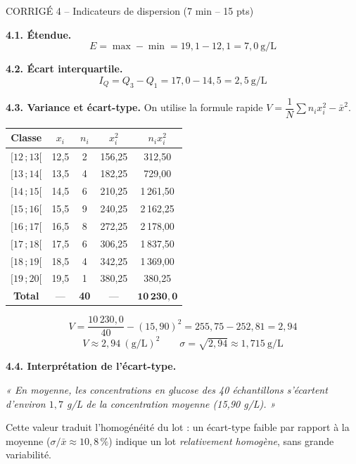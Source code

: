 \documentclass[11pt,a4paper]{article}
\begin{document}
\begin{epreuve}{CORRIGÉ 4 -- Indicateurs de dispersion \hfill \small (7 min -- 15 pts)}

\vspace{0.2cm}
\textbf{4.1. Étendue.}
$$\boxed{E = \max - \min = 19{,}1 - 12{,}1 = 7{,}0\ \text{g/L}}$$

\vspace{0.3cm}
\textbf{4.2. Écart interquartile.}
$$\boxed{I_Q = Q_3 - Q_1 = 17{,}0 - 14{,}5 = 2{,}5\ \text{g/L}}$$

\vspace{0.3cm}
\textbf{4.3. Variance et écart-type.} On utilise la formule rapide $V = \dfrac{1}{N}\sum n_i x_i^2 - \bar{x}^2$.

\begin{center}
\small
\renewcommand{\arraystretch}{1.35}
\begin{tabular}{|c|c|c|c|c|}
\hline
\rowcolor{corrige!15}
\textbf{Classe} & $x_i$ & $n_i$ & $x_i^2$ & $n_i x_i^2$ \\
\hline
$[12\,;13[$ & 12{,}5 & 2 & 156{,}25 & 312{,}50 \\
\hline
$[13\,;14[$ & 13{,}5 & 4 & 182{,}25 & 729{,}00 \\
\hline
$[14\,;15[$ & 14{,}5 & 6 & 210{,}25 & 1\,261{,}50 \\
\hline
$[15\,;16[$ & 15{,}5 & 9 & 240{,}25 & 2\,162{,}25 \\
\hline
$[16\,;17[$ & 16{,}5 & 8 & 272{,}25 & 2\,178{,}00 \\
\hline
$[17\,;18[$ & 17{,}5 & 6 & 306{,}25 & 1\,837{,}50 \\
\hline
$[18\,;19[$ & 18{,}5 & 4 & 342{,}25 & 1\,369{,}00 \\
\hline
$[19\,;20[$ & 19{,}5 & 1 & 380{,}25 & 380{,}25 \\
\hline
\rowcolor{corrige!15}
\textbf{Total} & --- & \textbf{40} & --- & $\mathbf{10\,230{,}0}$ \\
\hline
\end{tabular}
\end{center}

$$V = \frac{10\,230{,}0}{40} - (15{,}90)^2 = 255{,}75 - 252{,}81 = 2{,}94$$
$$\boxed{V \approx 2{,}94\ (\text{g/L})^2} \qquad \boxed{\sigma = \sqrt{2{,}94} \approx 1{,}715\ \text{g/L}}$$

\vspace{0.3cm}
\textbf{4.4. Interprétation de l'écart-type.}

\emph{« En moyenne, les concentrations en glucose des 40 échantillons s'écartent d'environ $1{,}7$ g/L de la concentration moyenne (15{,}90 g/L). »}

\medskip
Cette valeur traduit l'homogénéité du lot : un écart-type faible par rapport à la moyenne ($\sigma/\bar{x} \approx 10{,}8\,\%$) indique un lot \emph{relativement homogène}, sans grande variabilité.

\end{epreuve}
\end{document}
